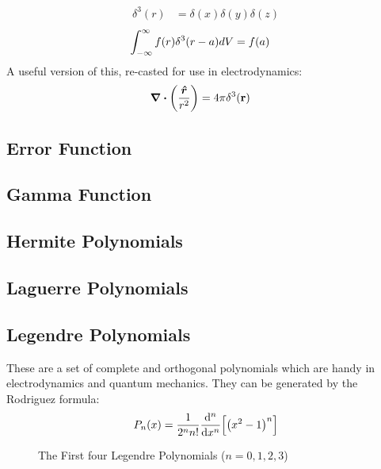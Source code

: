             \begin{align*}
                {\delta}^3(r) &= \delta(x) \delta(y) \delta(z)
            \end{align*}
            \begin{align*}
                \int_{-\infty}^{\infty} f(r) {\delta}^3(r-a) dV &= f(a)
            \end{align*}
            A useful version of this, re-casted for use in electrodynamics:
            \begin{align*}
                \div\qty(\frac{\e{r}}{{r}^2}) &= 4 \pi {\delta}^3(\vb{r})
            \end{align*}\newpage
            
    \subsection{Error Function}
    \subsection{Gamma Function}
    \subsection{Hermite Polynomials}
    \subsection{Laguerre Polynomials}
    \subsection{Legendre Polynomials}
        These are a set of complete and orthogonal polynomials which are handy in electrodynamics and quantum mechanics. 
        They can be generated by the Rodriguez formula\cite{pinsky_2011}:
        \begin{equation}
            P_n(x)=\oo{2^nn!}\der[n]{x}\qty[\qty(x^2-1)^n]
        \end{equation}
        \begin{figure}[h!]
            \centering
            \caption{The First four Legendre Polynomials ($n=0,1,2,3$)}
            \label{fig:legendre_graph}
        \end{figure}
%